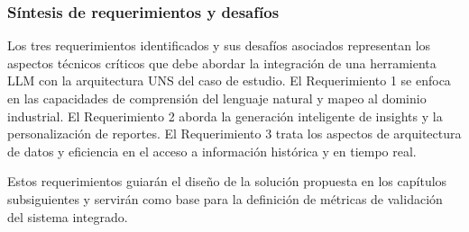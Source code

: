 \subsubsection{Síntesis de requerimientos y desafíos}

Los tres requerimientos identificados y sus desafíos asociados representan los aspectos técnicos críticos que debe abordar la integración de una herramienta LLM con la arquitectura UNS del caso de estudio. El Requerimiento 1 se enfoca en las capacidades de comprensión del lenguaje natural y mapeo al dominio industrial. El Requerimiento 2 aborda la generación inteligente de insights y la personalización de reportes. El Requerimiento 3 trata los aspectos de arquitectura de datos y eficiencia en el acceso a información histórica y en tiempo real.

Estos requerimientos guiarán el diseño de la solución propuesta en los capítulos subsiguientes y servirán como base para la definición de métricas de validación del sistema integrado.